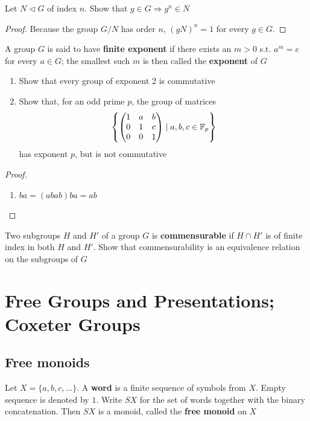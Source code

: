 \documentclass[11pt]{article}
\begin{document}
\begin{exercise}
\label{ex1.5}
Let \(N\lhd G\) of index \(n\). Show that \(g\in G\Rightarrow g^n\in N\)
\end{exercise}

\begin{proof}
Because the group \(G/N\) has order \(n\), \((gN)^n=1\) for every \(g\in G\).
\end{proof}

\begin{exercise}
\label{ex1.6}
A group \(G\) is said to have \textbf{finite exponent} if there exists an \(m>0\) s.t. \(a^m=e\) for
every \(a\in G\); the smallest such \(m\) is then called the \textbf{exponent} of \(G\)
\begin{enumerate}
\item Show that every group of exponent 2 is commutative
\item Show that, for an odd prime \(p\), the group of matrices
\begin{equation*}
\left\{
\begin{pmatrix}
1&a&b\\0&1&c\\0&0&1
\end{pmatrix}\mid a,b,c\in\mathbb{F}_p\right\}
\end{equation*}
has exponent \(p\), but is not commutative
\end{enumerate}
\end{exercise}

\begin{proof}
\begin{enumerate}
\item \(ba=(abab)ba=ab\)
\end{enumerate}
\end{proof}

\begin{exercise}
\label{ex1.7}
Two subgroups \(H\) and \(H'\) of a group \(G\) is \textbf{commensurable} if \(H\cap H'\) is of finite index
in both \(H\) and \(H'\). Show that commensurability is an equivalence relation on the subgroups
of \(G\)
\end{exercise}
\section{Free Groups and Presentations; Coxeter Groups}
\label{sec:org9b9c4e6}
\subsection{Free monoids}
\label{sec:orgec3ba46}
Let \(X=\{a,b,c,\dots\}\). A \textbf{word} is a finite sequence of symbols from \(X\). Empty sequence is
denoted by \(1\). Write \(SX\) for the set of words together with the binary concatenation.
Then \(SX\) is a monoid, called the \textbf{free monoid} on \(X\)
\end{document}
